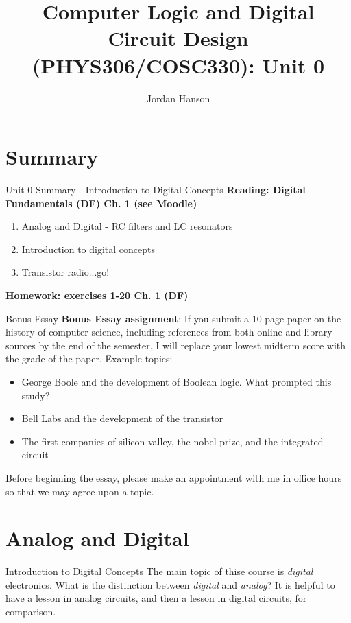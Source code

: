 \documentclass{beamer}
\title{Computer Logic and Digital Circuit Design (PHYS306/COSC330): Unit 0}
\author{Jordan Hanson}
\institute{Whittier College Department of Physics and Astronomy}
\begin{document}
\maketitle

\section{Summary}

\begin{frame}{Unit 0 Summary - Introduction to Digital Concepts}
\textbf{Reading: Digital Fundamentals (DF) Ch. 1 (see Moodle)}
\begin{enumerate}
\item Analog and Digital - RC filters and LC resonators
\item Introduction to digital concepts
\item Transistor radio...go!
\end{enumerate}
\textbf{Homework: exercises 1-20 Ch. 1 (DF)}
\end{frame}

\begin{frame}{Bonus Essay}
\small
\textbf{\alert{Bonus Essay assignment}}: If you submit a 10-page paper on the history of computer science, including references from both online and library sources by the end of the semester, I will replace your lowest midterm score with the grade of the paper.  Example topics:
\begin{itemize}
\item George Boole and the development of Boolean logic.  What prompted this study?
\item Bell Labs and the development of the transistor
\item The first companies of silicon valley, the nobel prize, and the integrated circuit
\end{itemize}
Before beginning the essay, please make an appointment with me in office hours so that we may agree upon a topic.
\end{frame}

\section{Analog and Digital}

\begin{frame}{Introduction to Digital Concepts}
The main topic of thise course is \alert{\textit{digital}} electronics.  What is the distinction between \alert{\textit{digital}} and \alert{\textit{analog}}?  It is helpful to have a lesson in analog circuits, and then a lesson in digital circuits, for comparison.
\end{frame}
\end{document}
